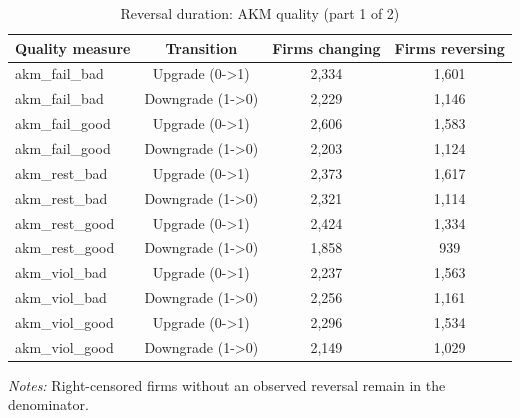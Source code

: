 \begin{table}[htbp]
\footnotesize
\centering
\caption{Reversal duration: AKM quality (part 1 of 2)}
\begin{threeparttable}
\begin{tabular}{p{}ccc}
\toprule
Quality measure & Transition & Firms changing & Firms reversing \\
\midrule
akm\_fail\_bad & Upgrade (0->1) & 2,334 & 1,601 \\
akm\_fail\_bad & Downgrade (1->0) & 2,229 & 1,146 \\
akm\_fail\_good & Upgrade (0->1) & 2,606 & 1,583 \\
akm\_fail\_good & Downgrade (1->0) & 2,203 & 1,124 \\
akm\_rest\_bad & Upgrade (0->1) & 2,373 & 1,617 \\
akm\_rest\_bad & Downgrade (1->0) & 2,321 & 1,114 \\
akm\_rest\_good & Upgrade (0->1) & 2,424 & 1,334 \\
akm\_rest\_good & Downgrade (1->0) & 1,858 & 939 \\
akm\_viol\_bad & Upgrade (0->1) & 2,237 & 1,563 \\
akm\_viol\_bad & Downgrade (1->0) & 2,256 & 1,161 \\
akm\_viol\_good & Upgrade (0->1) & 2,296 & 1,534 \\
akm\_viol\_good & Downgrade (1->0) & 2,149 & 1,029 \\
\bottomrule
\end{tabular}
\begin{tablenotes}\footnotesize
\item \raggedright \textit{Notes:} Right-censored firms without an observed reversal remain in the denominator.
\end{tablenotes}
\end{threeparttable}
\end{table}

